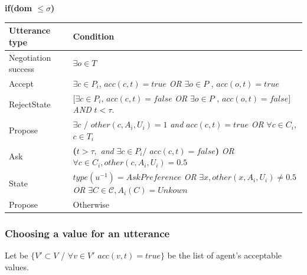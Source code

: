 \documentclass{llncs}
\begin{document}
				
				\textbf{if(\textbf{dom  $ \leq \sigma$})} 
				\begin{table}
					\centering
				\begin{tabular}{|p{3cm}|p{9cm}|}
					\hline
					\textbf{Utterance type} & Condition \\
					\hline
					Negotiation success &  $\exists o \in T$ \\
					\hline
					Accept & $\exists c \in P_i$, $acc(c, t)=true $ \newline \emph{OR}   \newline $ \exists o \in P$ ,  $acc(o, t) =true$ \\
					\hline
					RejectState & $ [\exists c \in P_i$, $acc(c, t)= false $  \emph{OR}   $ \exists o \in P$ ,  $acc(o, t)=false]$ \newline  \emph{AND} $t<\tau$.\\
					\hline
					Propose & $\exists c$ / $other(c, A_i, U_i)  = 1 $  \emph{and}
					\newline $acc(c, t)=true$
					\newline \emph{OR}  
					\newline $\forall c \in C_i$,  $c \in T_i$\\
					\hline
					Ask &  \textbf{(}$t> \tau,$ \emph{and} 
					$\exists c \in P_i /$
					$ acc(c, t)=false$\textbf{) }
					\newline \emph{OR}
					\newline $ \forall c \in C_i,other(c, A_i, U_i)=0.5$ \\
					\hline
					
					State & $type(u^{-1}) = AskPreference$
					\newline \emph{OR}
					\newline $\exists x,other(x, A_i, U_i) \not = 0.5 $ 
					\newline \emph{OR}
					\newline $ \exists C \in \mathcal{C}, A_i(C) = Unkown$
					\\
					\hline
					Propose & Otherwise \\
					\hline
				\end{tabular}
					\end{table}
				
				\subsubsection{Choosing a value for an utterance} 
				
				
				Let be $\{V' \subset V$ / $\forall v \in V'$ $ acc(v,t) = true\}$ be the list of agent's acceptable values. 
				
\end{document}
